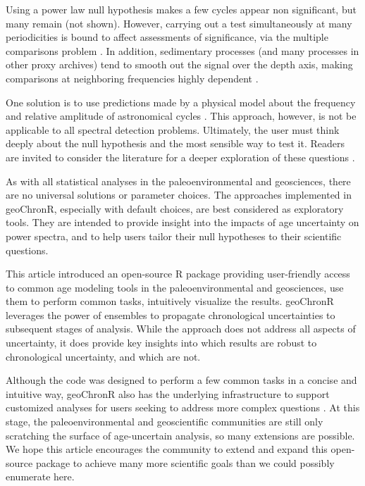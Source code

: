 \documentclass[gchron, manuscript]{copernicus}
\begin{document}
Using a power law null hypothesis makes a few cycles appear non significant, but many remain (not shown).
However, carrying out a test simultaneously at many periodicities is bound to affect assessments of significance, via the multiple comparisons problem \citep{Vaughan_PP2011}. In addition, sedimentary processes (and many processes in other proxy archives) tend to smooth out the signal over the depth axis, making comparisons at neighboring frequencies highly dependent \citep{Meyers_2012}.

One solution is to use predictions made by a physical model about the frequency and relative amplitude of astronomical cycles \citep{MeyersSageman_2007}. This approach, however, is not be applicable to all spectral detection problems. Ultimately, the user must think deeply about the null hypothesis and the most sensible way to test it. Readers are invited to consider the literature for a deeper exploration of these questions \citep[e.g.,][]{Vaughan_PP2011, Meyers_2012, Meyers_2015, MeyersMalinverno2018}.

As with all statistical analyses in the paleoenvironmental and geosciences, there are no universal solutions or parameter choices.
The approaches implemented in geoChronR, especially with default choices, are best considered as exploratory tools.
They are intended to provide insight into the impacts of age uncertainty on power spectra, and to help users tailor their null hypotheses to their scientific questions.

\conclusions

This article introduced an open-source R package providing user-friendly access to common age modeling tools in the paleoenvironmental and geosciences, use them to perform common tasks, intuitively visualize the results. geoChronR leverages the power of ensembles to propagate chronological uncertainties to subsequent stages of analysis. While the approach does not address all aspects of uncertainty, it does provide key insights into which results are robust to chronological uncertainty, and which are not.

Although the code was designed to perform a few common tasks in a concise and intuitive way, geoChronR also has the underlying infrastructure to support customized analyses for users seeking to address more complex questions \citep[e.g.][]{thomas2018sikuiui}. At this stage, the paleoenvironmental and geoscientific communities are still only scratching the surface of age-uncertain analysis, so many extensions are possible. We hope this article encourages the community to extend and expand this open-source package to achieve many more scientific goals than we could possibly enumerate here.
\end{document}
